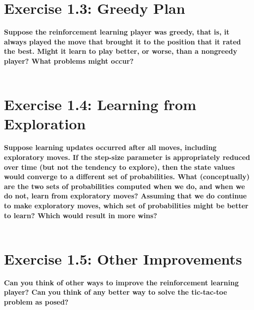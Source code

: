 \documentclass[a4paper,11pt]{article}
\numberwithin{equation}{section}
\theoremstyle{remark}
\begin{document}
\section{Exercise 1.3: Greedy Plan}

\textbf{Suppose the reinforcement learning player was greedy, that is, it always played the move that brought it to the position that it rated the best. Might it learn to play better, or worse, than a nongreedy player? What problems might occur?}
\\ \\


\section{Exercise 1.4: Learning from Exploration}

\textbf{Suppose learning updates occurred after all moves, including exploratory moves. If the step-size parameter is appropriately reduced over time (but not the tendency to explore), then the state values would converge to a different set of probabilities. What (conceptually) are the two sets of probabilities computed when we do, and when we do not, learn from exploratory moves? Assuming that we do continue to make exploratory moves, which set of probabilities might be better to learn? Which would result in more wins?}
\\ \\


\section{Exercise 1.5: Other Improvements}

\textbf{Can you think of other ways to improve the reinforcement learning player? Can you think of any better way to solve the tic-tac-toe problem as posed?}
\\ \\
\end{document}
